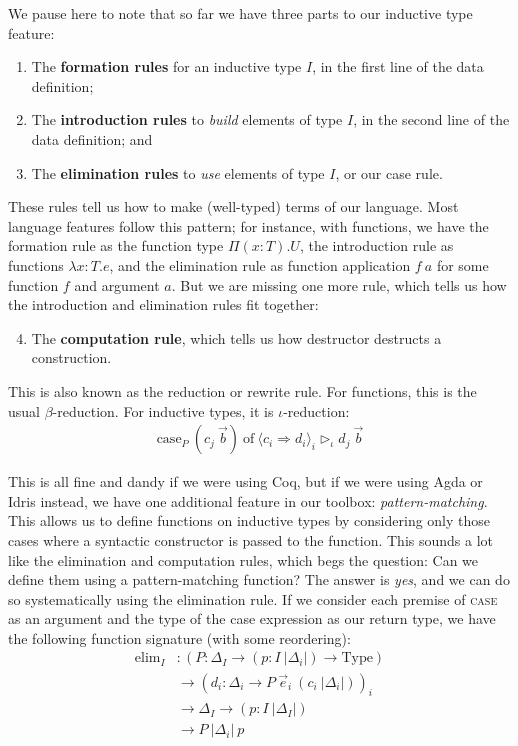 \documentclass{report}
\newcommand{\const}[1]{\text{#1}}
\newcommand{\Type}{\const{Type}}
\newcommand{\case}{\const{case}}
\newcommand{\of}{\const{of}}
\newcommand{\elim}{\const{elim}}
\newcommand{\refrule}[1]{\textsc{#1}}
\begin{document}
We pause here to note that so far we have three parts to our inductive type feature:

\begin{enumerate}
    \item The \textbf{formation rules} for an inductive type $I$, in the first line of the data definition;
    \item The \textbf{introduction rules} to \emph{build} elements of type $I$, in the second line of the data definition; and
    \item The \textbf{elimination rules} to \emph{use} elements of type $I$, or our case rule.
\end{enumerate}

These rules tell us how to make (well-typed) terms of our language. Most language features follow this pattern; for instance, with functions, we have the formation rule as the function type $\Pi(x:T).U$, the introduction rule as functions $\lambda x:T.e$, and the elimination rule as function application $f ~ a$ for some function $f$ and argument $a$. But we are missing one more rule, which tells us how the introduction and elimination rules fit together:

\begin{enumerate}\setcounter{enumi}{3}
    \item The \textbf{computation rule}, which tells us how destructor destructs a construction.
\end{enumerate}

This is also known as the reduction or rewrite rule. For functions, this is the usual $\beta$-reduction. For inductive types, it is $\iota$-reduction:
%
\begin{align*}
    \case_P ~ (c_j ~ \Vec{b}) ~ \of ~ \langle c_i \Rightarrow d_i \rangle_i \rhd_\iota d_j ~ \Vec{b}
\end{align*}

This is all fine and dandy if we were using Coq, but if we were using Agda or Idris instead, we have one additional feature in our toolbox: \emph{pattern-matching}. This allows us to define functions on inductive types by considering only those cases where a syntactic constructor is passed to the function. This sounds a lot like the elimination and computation rules, which begs the question: Can we define them using a pattern-matching function? The answer is \emph{yes}, and we can do so systematically using the elimination rule. If we consider each premise of \refrule{case} as an argument and the type of the case expression as our return type, we have the following function signature (with some reordering):
%
\begin{align*}
    \elim_I &: (P : \Delta_I \to (p : I ~ |\Delta_i|) \to \Type) \\
    &\to (d_i : \Delta_i \to P ~ \Vec{e}_i ~ (c_i ~ |\Delta_i|))_i \\
    &\to \Delta_I \to (p : I ~ |\Delta_I|) \\
    &\to P ~ |\Delta_i| ~ p
\end{align*}
\end{document}
